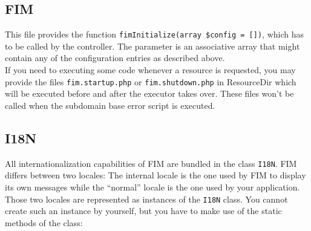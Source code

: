 \documentclass{scrartcl}
\begin{document}
   \subsection{FIM}
      This file provides the function \lstinline!fimInitialize(array $config = [])!, which has to be called by the controller. The parameter is an associative array that might contain any of the configuration entries as described above. \\
      If you need to executing some code whenever a resource is requested, you may provide the files \texttt{fim.startup.php} or \texttt{fim.shutdown.php} in ResourceDir which will be executed before and after the executor takes over. These files won't be called when the subdomain base error script is executed.
   \subsection{I18N}
      All internationalization capabilities of FIM are bundled in the class \lstinline!I18N!. FIM differs between two locales: The internal locale is the one used by FIM to display its own messages while the ``normal'' locale is the one used by your application. Those two locales are represented as instances of the \lstinline!I18N! class. You cannot create such an instance by yourself, but you have to make use of the static methods of the class:
\end{document}
